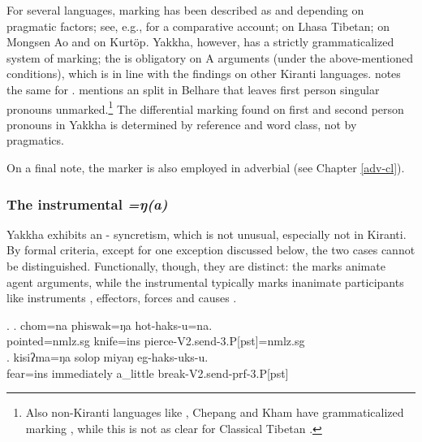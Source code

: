 	
\newpage
For several  languages,  marking has been described as  and depending on pragmatic factors; see, e.g., \citet{LaPolla1995_Ergative} for a comparative account; \citet{Tournadre1991_Rhetorical} on Lhasa Tibetan; \citet{Coupe2007_Mongsen} on Mongsen Ao and \citet{Hyslop2011_Kurtop} on Kurtöp. Yakkha, however, has a strictly grammaticalized system of  marking; the  is obligatory on A arguments (under the above-mentioned conditions), which is in line with the findings on other Kiranti languages. \citet[74]{Doornenbal2009A-grammar} notes  the same for .  \citet[549]{Bickel2003Belhare} mentions an  split in Belhare that leaves first person singular pronouns unmarked.\footnote{Also non-Kiranti languages like , Chepang and Kham have  grammaticalized  marking \citep{LaPolla1995_Ergative}, while this is not as clear for Classical Tibetan \citep{DeLancey2011_Optional}.} The differential marking found on first and second person pronouns in Yakkha is determined by reference and word class, not by pragmatics. 

On a final note, the  marker is also employed in adverbial  (see Chapter \ref{adv-cl}).


\subsubsection{The instrumental \emph{=ŋ(a)}}\label{case-ins}
Yakkha exhibits an - syncretism, which is not unusual, especially not in Kiranti. By formal criteria, except for one exception discussed below, the two cases cannot be distinguished.  Functionally, though, they are distinct: the  marks animate agent arguments, while the instrumental  typically marks inanimate participants like  instruments \Next[a], effectors, forces and causes \Next[b]. 

	\ex. \ag. chom=na phiswak=ŋa hot-haks-u=na.\\
	pointed{\sc =nmlz.sg} knife{\sc =ins} pierce-{\sc V2.send-3.P[pst]=nmlz.sg}\\
	\bg. kisiʔma=ŋa solop miyaŋ eg-haks-uks-u.\\
		fear{\sc =ins} immediately a\_little  break{\sc-V2.send-prf-3.P[pst]}\\
		 
		
